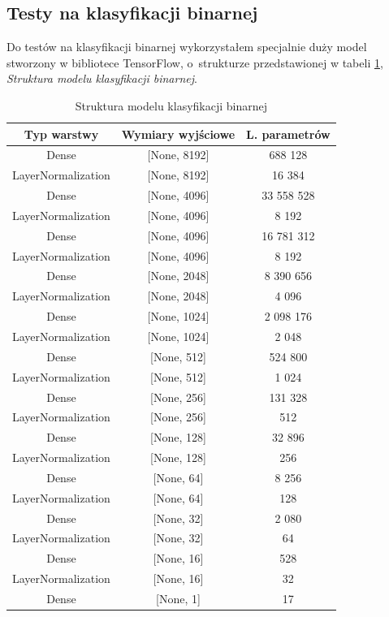 \subsection{Testy na klasyfikacji binarnej}
Do testów na klasyfikacji binarnej wykorzystałem specjalnie duży model stworzony w bibliotece TensorFlow, o~strukturze przedstawionej w tabeli \ref{tab:classification_binary_model_structure}, \textit{Struktura modelu klasyfikacji binarnej}. \\
\begin{table}[htbp]
    \centering
    \caption{Struktura modelu klasyfikacji binarnej}
    \label{tab:classification_binary_model_structure}
    \begin{tabular}{|c|c|c|}
        \hline
        \textbf{Typ warstwy} & \textbf{Wymiary wyjściowe} & \textbf{L. parametrów} \\
        \hline
        Dense & [None, 8192] & 688 128 \\
        \hline
        LayerNormalization & [None, 8192] & 16 384 \\
        \hline
        Dense & [None, 4096] & 33 558 528 \\
        \hline
        LayerNormalization & [None, 4096] & 8 192 \\
        \hline
        Dense & [None, 4096] & 16 781 312 \\
        \hline
        LayerNormalization & [None, 4096] & 8 192 \\
        \hline
        Dense & [None, 2048] & 8 390 656 \\
        \hline
        LayerNormalization & [None, 2048] & 4 096 \\
        \hline
        Dense & [None, 1024] & 2 098 176 \\
        \hline
        LayerNormalization & [None, 1024] & 2 048 \\
        \hline
        Dense & [None, 512] & 524 800 \\
        \hline
        LayerNormalization & [None, 512] & 1 024 \\
        \hline
        Dense & [None, 256] & 131 328 \\
        \hline
        LayerNormalization & [None, 256] & 512 \\
        \hline
        Dense & [None, 128] & 32 896 \\
        \hline
        LayerNormalization & [None, 128] & 256 \\
        \hline
        Dense & [None, 64] & 8 256 \\
        \hline
        LayerNormalization & [None, 64] & 128 \\
        \hline
        Dense & [None, 32] & 2 080 \\
        \hline
        LayerNormalization & [None, 32] & 64 \\
        \hline
        Dense & [None, 16] & 528 \\
        \hline
        LayerNormalization & [None, 16] & 32 \\
        \hline
        Dense & [None, 1] & 17 \\
        \hline
    \end{tabular}
\end{table}
